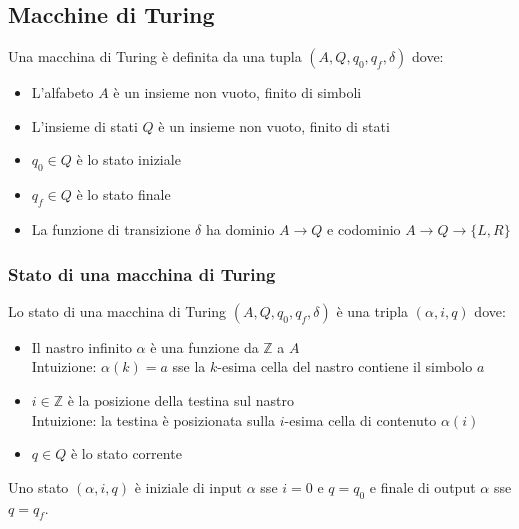 \documentclass{article}
\begin{document}
\pagebreak

\subsection{Macchine di Turing}    
Una macchina di Turing è definita da una tupla $(A, Q, q_0, q_f, \delta)$ dove:
\begin{itemize}
    \item L’alfabeto $A$ è un insieme non vuoto, finito di simboli
    \item L’insieme di stati $Q$ è un insieme non vuoto, finito di stati
    \item $q_0\in Q$ è lo stato iniziale
    \item $q_f \in Q$ è lo stato finale
    \item La funzione di transizione $\delta$ ha dominio $A \to Q$ e codominio $A \to Q \to \{L, R\}$
\end{itemize}

\subsubsection{Stato di una macchina di Turing}
Lo stato di una macchina di Turing $(A, Q, q_0, q_f,\delta )$ è una tripla $(\alpha, i , q)$ dove:
\begin{itemize}
    \item Il nastro infinito $\alpha$ è una funzione da $\mathbb{Z}$ a $A$ \\ Intuizione: $\alpha(k) = a$ sse la $k$-esima cella del nastro contiene il simbolo $a$
    \item  $i \in \mathbb{Z}$ è la posizione della testina sul nastro \\ Intuizione: la testina è posizionata sulla $i$-esima cella di contenuto $\alpha(i)$
    \item $q \in Q$ è lo stato corrente
\end{itemize}

Uno stato $(\alpha, i, q)$ è iniziale di input $\alpha$ sse $i = 0$ e $q = q_0$ e finale di output $\alpha$ sse $q = q_f$.
\end{document}

